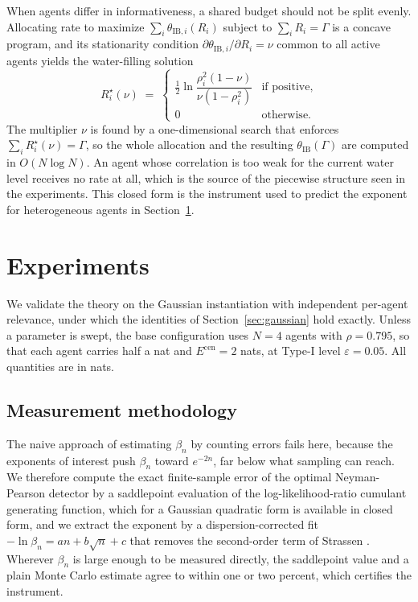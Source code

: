 \documentclass[journal]{IEEEtran}
\theoremstyle{definition}
\theoremstyle{remark}
\newcommand{\Ecen}{E^{\mathrm{cen}}}
\newcommand{\tib}{\theta_{\mathrm{IB}}}
\newcommand{\tibi}{\theta_{\mathrm{IB},i}}
\begin{document}
When agents differ in informativeness, a shared budget should not be split evenly. Allocating rate to maximize
$\sum_i \tibi(R_i)$ subject to $\sum_i R_i=\Gamma$ is a concave program, and its stationarity condition
$\partial \tibi/\partial R_i=\nu$ common to all active agents yields the water-filling solution
\begin{equation}
R_i^\star(\nu)\;=\;
\begin{cases}
\tfrac12\ln\!\dfrac{\rho_i^2(1-\nu)}{\nu(1-\rho_i^2)} & \text{if positive},\\[2pt]
0 & \text{otherwise}.
\end{cases}
\label{eq:waterfill}
\end{equation}
The multiplier $\nu$ is found by a one-dimensional search that enforces $\sum_i R_i^\star(\nu)=\Gamma$, so the
whole allocation and the resulting $\tib(\Gamma)$ are computed in $O(N\log N)$. An agent whose correlation is too
weak for the current water level receives no rate at all, which is the source of the piecewise structure seen in
the experiments. This closed form is the instrument used to predict the exponent for heterogeneous agents in
Section~\ref{sec:exp}.

\section{Experiments}\label{sec:exp}
We validate the theory on the Gaussian instantiation with independent per-agent relevance, under which the
identities of Section~\ref{sec:gaussian} hold exactly. Unless a parameter is swept, the base configuration uses
$N=4$ agents with $\rho=0.795$, so that each agent carries half a nat and $\Ecen=2$ nats, at Type-I level
$\varepsilon=0.05$. All quantities are in nats.

\subsection{Measurement methodology}
The naive approach of estimating $\beta_n$ by counting errors fails here, because the exponents of interest push
$\beta_n$ toward $e^{-2n}$, far below what sampling can reach. We therefore compute the exact finite-sample error
of the optimal Neyman-Pearson detector by a saddlepoint evaluation of the log-likelihood-ratio cumulant
generating function, which for a Gaussian quadratic form is available in closed form, and we extract the exponent
by a dispersion-corrected fit $-\ln\beta_n=an+b\sqrt n+c$ that removes the second-order term of Strassen
\cite{strassen1962,ppv2010}. Wherever $\beta_n$ is large enough to be measured directly, the saddlepoint value and
a plain Monte Carlo estimate agree to within one or two percent, which certifies the instrument.
\end{document}
